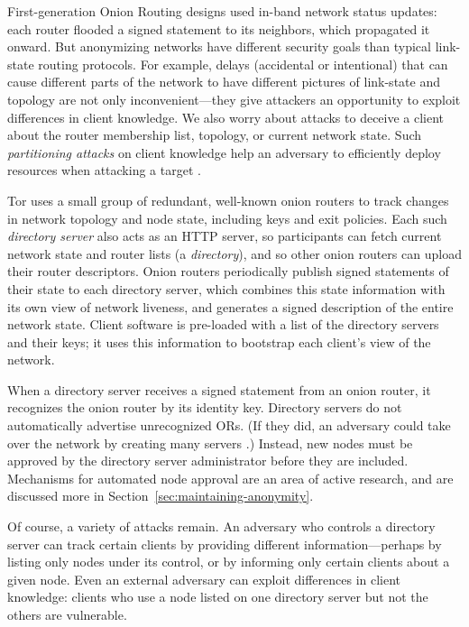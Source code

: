 \documentclass[times,10pt,twocolumn]{article}
\begin{document}
\label{subsec:dirservers}

First-generation Onion Routing designs \cite{freedom2-arch,or-jsac98} used
in-band network status updates: each router flooded a signed statement
to its neighbors, which propagated it onward. But anonymizing networks
have different security goals than typical link-state routing protocols.
For example, delays (accidental or intentional)
that can cause different parts of the network to have different pictures
of link-state and topology are not only inconvenient---they give
attackers an opportunity to exploit differences in client knowledge.
We also worry about attacks to deceive a
client about the router membership list, topology, or current network
state. Such \emph{partitioning attacks} on client knowledge help an
adversary to efficiently deploy resources
when attacking a target \cite{minion-design}.


Tor uses a small group of redundant, well-known onion routers to
track changes in network topology and node state, including keys and
exit policies.  Each such \emph{directory server} also acts as an HTTP
server, so participants can fetch current network state and router
lists (a \emph{directory}), and so other onion routers can upload
their router descriptors.  Onion routers periodically publish signed
statements of their state to each directory server, which combines this
state information with its own view of network liveness, and generates
a signed description of the entire network state. Client software is
pre-loaded with a list of the directory servers and their keys; it uses
this information to bootstrap each client's view of the network.

When a directory server receives a signed statement from an onion
router, it recognizes the onion router by its identity key. Directory
servers do not automatically advertise unrecognized ORs. (If they did,
an adversary could take over the network by creating many servers
\cite{sybil}.) Instead, new nodes must be approved by the directory
server administrator before they are included. Mechanisms for automated
node approval are an area of active research, and are discussed more
in Section~\ref{sec:maintaining-anonymity}.
  
Of course, a variety of attacks remain. An adversary who controls
a directory server can track certain clients by providing different
information---perhaps by listing only nodes under its control, or by
informing only certain clients about a given node. Even an external
adversary can exploit differences in client knowledge: clients who use
a node listed on one directory server but not the others are vulnerable.
\end{document}
